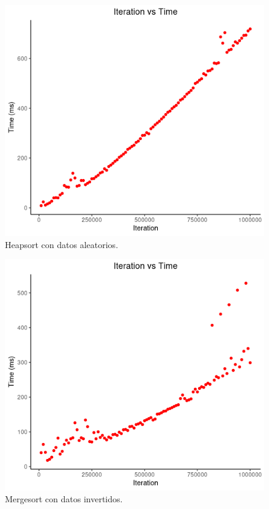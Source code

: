 \documentclass[paper=a4, fontsize=11pt]{scrartcl} %
\numberwithin{equation}{section} %
\numberwithin{figure}{section} %
\numberwithin{table}{section} %
\begin{document}
\begin{figure}
    \includegraphics[width=\linewidth]{heap_random.png}
    \caption{Heapsort con datos aleatorios.}
\end{figure}


\begin{figure}
    \includegraphics[width=\linewidth]{merge_inverse.png}
    \caption{Mergesort con datos invertidos.}
\end{figure}
\end{document}
